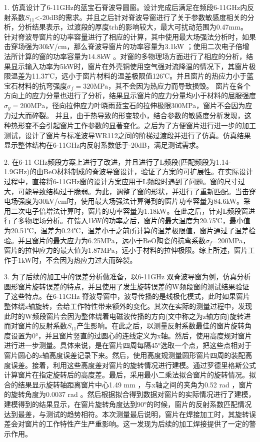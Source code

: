 \documentclass[master]{thesis-uestc}
\begin{document}
1. 仿真设计了6-11GHz的蓝宝石脊波导圆窗。设计完成后满足在频段6-11GHz内反射系数\(S_{11}\)<-20dB的需求。并且之后针对脊波导窗进行了关于参数敏感度相关的分析，分析结果表示，过渡段的厚度trh的影响较大，最大可扰动范围为0.47mm。
针对脊波导窗片的功率容量进行了相应的计算，其中使用最大场强法分析时，如果击穿场强为30kV/cm，那么脊波导窗片的功率容量为3.1kW ；使用二次电子倍增法所计算的窗的功率容量为14.8kW 。对窗的多物理场方面进行了相应的分析，结果显示输入功率为5kW时，窗片在外壳铜使用空气强对流降温的情况下，其窗片极限温差为11.37℃，远小于窗片材料的温差极限值126℃。并且窗片的热应力小于蓝宝石材料的抗弯强度\(\sigma_f = 320\)MPa，其不会因为热应力而导致损毁。
窗片在各个方向上的应力分量也进行了分析，结果显示窗片的应力分量均小于材料的屈服强度\(\sigma_y = 200\)MPa，径向拉伸应力叶晓雨蓝宝石的拉伸极限300MPa，窗片不会因为应力过大而碎裂。
并且，由于热导致的形变较小，结合参数的敏感度分析发现，这种热形变不会引起窗片工作参数的显著变化。之后为了方便窗片进行进一步的加工测试，设计了窗片与标准波导WR112之间的阶梯过渡段并进行了仿真。仿真结果显示整体结构在6-11GHz内反射系数低于-20dB，满足测试需求。

2. 在6-11 GHz频段方案上进行了改进，并且进行了L频段(匹配频段为1.14-1.9GHz)的由BeO材料制成的脊波导窗设计，验证了方案的可扩展性。在实际设计过程中，直接将6-11GHz窗的设计方案应用于L频段时遇到了问题。窗的尺寸过大，可能导致结构过于脆弱。为此，调整了窗的形状，并进行了重新匹配。当击穿电场强度为30kV/cm时，使用最大场强法计算得到的窗片功率容量为84.6kW。采用二次电子倍增法计算时，窗片的功率容量为1.18kW。在此之后，针对L频段窗进行了多物理场分析。在馈入1kW的功率之后，窗片的最大温度为20.75℃，最小值为20.51℃，温差为0.24℃，温差小于之前所计算的温差极限值，窗片通过了温差检验。并且窗片的最大应力为6.25MPa，远小于BeO陶瓷的抗弯系数\(\sigma_f\)=200MPa，窗片的拉伸应力的最大值为1.87MPa，远小于材料的拉伸极限。综上所述，窗片工作于1kW时，不会因为热应力过大而碎裂。

3. 为了后续的加工中的误差分析做准备，以6-11GHz 双脊波导窗为例，仿真分析圆形窗片旋转误差的特点，并且使用了发生旋转误差的W频段窗的测试结果验证了这些特点。在6-11GHz 脊波导窗中，波导传播的是线极化模式，此时如果窗片整体绕z轴旋转，会给工作特性带来额外的变化。其次在实际的测量过程中，发现此时的W频段窗片会因为整体绕着电磁波传播的方向(文中称之为z轴方向)旋转进而对窗片的反射系数\(S_{11}\)产生影响。在此之后，以测量反射系数最佳的窗片旋转角度设置为0°，并且窗片竖直的过圆心的连线定义为x轴。然后，使用高度规对窗片进行进一步测量。具体来说，是在窗片四周每隔45°选取一个点，把这些点相对于窗片圆心的z轴高度误差记录下来。然后，使用高度规测量圆形窗片四周的装配高度误差。接着，利用这些高度差对窗片的旋转情况进行建模。通过罗德里格斯公式计算窗片在指定旋转后的高度差。最后，采用最小二乘法拟合窗片的旋转情况。拟合的结果显示旋转轴距离窗片中心1.49 mm ，与x轴之间的夹角为0.52 rad ，窗片的旋转角度为0.0037 rad 。然后根据拟合得到数据对窗片的实际情况进行了建模，建模得到的结果显示，在窗片旋转角度达到90°的时候，窗片的反射系数匹配情况达到最差，与测试的趋势相符。本次测量最后说明，窗片在焊接加工时，其旋转误差会对窗片的工作特性产生严重影响。这一发现为后续的加工焊接提供了一定的警示作用。
\end{document}
